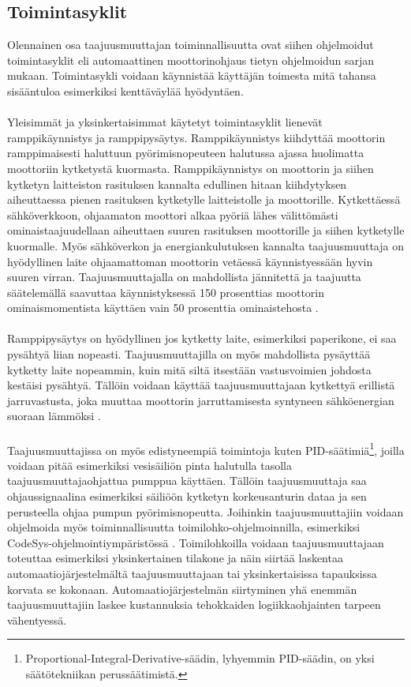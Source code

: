 \documentclass[finnish,12pt,a4paper,pdftex,elec,utf8]{aaltothesis}
\begin{document}

\subsection{Toimintasyklit}
Olennainen osa taajuusmuuttajan toiminnallisuutta ovat siihen ohjelmoidut toimintasyklit eli automaattinen moottorinohjaus tietyn ohjelmoidun sarjan mukaan. Toimintasykli voidaan käynnistää käyttäjän toimesta mitä tahansa sisääntuloa esimerkiksi kenttäväylää hyödyntäen. \cite{ABBtechnicalguide}
\\\\
Yleisimmät ja yksinkertaisimmat käytetyt toimintasyklit lienevät ramppikäynnistys ja ramppipysäytys. Ramppikäynnistys kiihdyttää moottorin ramppimaisesti haluttuun pyörimisnopeuteen halutussa ajassa huolimatta moottoriin kytketystä kuormasta.
Ramppikäynnistys on moottorin ja siihen kytketyn laitteiston rasituksen kannalta edullinen hitaan kiihdytyksen aiheuttaessa pienen rasituksen kytketylle laitteistolle ja moottorille. Kytkettäessä sähköverkkoon, ohjaamaton moottori alkaa pyöriä lähes välittömästi ominaistaajuudellaan aiheuttaen suuren rasituksen moottorille ja siihen kytketylle kuormalle. Myös sähköverkon ja energiankulutuksen kannalta taajuusmuuttaja on hyödyllinen laite ohjaamattoman moottorin vetäessä käynnistyessään hyvin suuren virran. Taajuusmuuttajalla on mahdollista jännitettä ja taajuutta säätelemällä saavuttaa käynnistyksessä 150 prosenttias moottorin ominaismomentista käyttäen vain 50 prosenttia ominaistehosta \cite{ABBtechnicalguide}.
\\\\
Ramppipysäytys on hyödyllinen jos kytketty laite, esimerkiksi paperikone, ei saa pysähtyä liian nopeasti. Taajuusmuuttajilla on myös mahdollista pysäyttää kytketty laite nopeammin, kuin mitä siltä itsestään vastusvoimien johdosta kestäisi pysähtyä. Tällöin voidaan käyttää taajuusmuuttajaan kytkettyä erillistä jarruvastusta, joka muuttaa moottorin jarruttamisesta syntyneen sähköenergian suoraan lämmöksi \cite{ABBtechnicalguide}.
\\\\
Taajuusmuuttajissa on myös edistyneempiä toimintoja kuten PID-säätimiä\footnote{Proportional-Integral-Derivative-säädin, lyhyemmin PID-säädin, on yksi säätötekniikan perussäätimistä.}, joilla voidaan pitää esimerkiksi vesisäiliön pinta halutulla tasolla taajuusmuuttajaohjattua pumppua käyttäen. Tällöin taajuusmuuttaja saa ohjaussignaalina esimerkiksi säiliöön kytketyn korkeusanturin dataa ja sen perusteella ohjaa pumpun pyörimisnopeutta. Joihinkin taajuusmuuttajiin voidaan ohjelmoida myös toiminnallisuutta toimilohko-ohjelmoinnilla, esimerkiksi CodeSys-ohjelmointiympäristössä \cite{MyyntiHaastattelu}. Toimilohkoilla voidaan taajuusmuuttajaan toteuttaa esimerkiksi yksinkertainen tilakone ja näin siirtää laskentaa automaatiojärjestelmältä taajuusmuuttajaan tai yksinkertaisissa tapauksissa korvata se kokonaan. Automaatiojärjestelmän siirtyminen yhä enemmän taajuusmuuttajiin laskee kustannuksia tehokkaiden logiikkaohjainten tarpeen vähentyessä.
\end{document}
